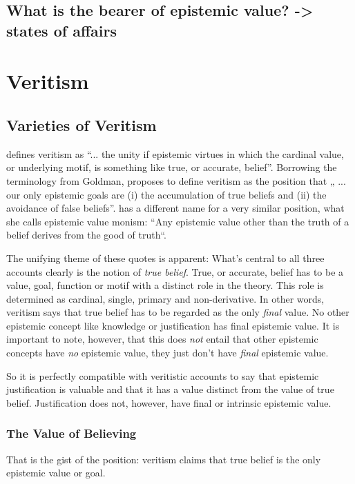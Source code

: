 \documentclass[12pt,numbers=noenddot]{scrartcl}
\begin{document}
\subsection{ What is the bearer of epistemic value? -> states of affairs}

\section{Veritism}
\subsection{Varieties of Veritism}\label{sec:varieties}

\textcite[54]{Goldman2002-GOLTUO-2} defines veritism as  “... the unity if epistemic virtues in which the cardinal value, or underlying motif, is something like true, or accurate, belief”. Borrowing the terminology from Goldman, \textcite[360]{Berker2013-BERETA-2} proposes to define veritism as the position that „ ... our only epistemic goals are (i) the accumulation of true beliefs and (ii) the avoidance of false beliefs”. \textcite{Zagzebski2004-ZAGEVM-2} has a different name for a very similar position, what she calls epistemic value monism: “Any epistemic value other than the truth of a belief derives from the good of truth“. 

The unifying theme of these quotes is apparent: What’s central to all three accounts clearly is the notion of \emph{true belief}. True, or accurate, belief has to be a value, goal, function or motif with a distinct role in the theory. This role is determined as cardinal, single, primary and non-derivative. In other words, veritism says that true belief has to be regarded as the only \emph{final} value. No other epistemic concept like knowledge or justification has final epistemic value. It is important to note, however, that this does \emph{not} entail that other epistemic concepts have \emph{no} epistemic value, they just don’t have \emph{final} epistemic value.

So it is perfectly compatible with veritistic accounts to say that epistemic justification is valuable and that it has a value distinct from the value of true belief. Justification does not, however, have final or intrinsic epistemic value.

\subsubsection{The Value of Believing}
That is the gist of the position: veritism claims that true belief is the only epistemic value or goal. 
\end{document}
